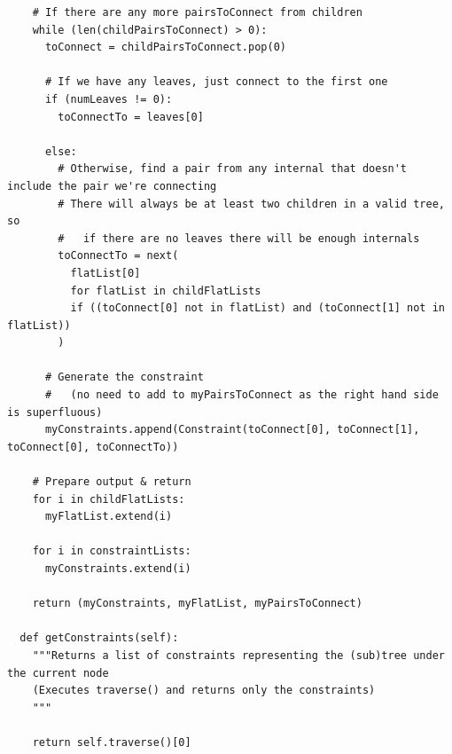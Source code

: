 \documentclass[11pt]{article} %
\begin{document}
\begin{landscape}
\begin{lstlisting}
    # If there are any more pairsToConnect from children
    while (len(childPairsToConnect) > 0):
      toConnect = childPairsToConnect.pop(0)

      # If we have any leaves, just connect to the first one
      if (numLeaves != 0):
        toConnectTo = leaves[0]
      
      else:
        # Otherwise, find a pair from any internal that doesn't include the pair we're connecting
        # There will always be at least two children in a valid tree, so
        #   if there are no leaves there will be enough internals
        toConnectTo = next(
          flatList[0]
          for flatList in childFlatLists
          if ((toConnect[0] not in flatList) and (toConnect[1] not in flatList))
        )
      
      # Generate the constraint
      #   (no need to add to myPairsToConnect as the right hand side is superfluous)
      myConstraints.append(Constraint(toConnect[0], toConnect[1], toConnect[0], toConnectTo))
    
    # Prepare output & return
    for i in childFlatLists:
      myFlatList.extend(i)
    
    for i in constraintLists:
      myConstraints.extend(i)

    return (myConstraints, myFlatList, myPairsToConnect)
  
  def getConstraints(self):
    """Returns a list of constraints representing the (sub)tree under the current node
    (Executes traverse() and returns only the constraints)
    """

    return self.traverse()[0]
\end{lstlisting}
\end{landscape}
\end{document}
